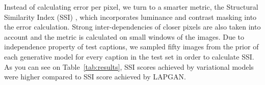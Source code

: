 \documentclass{article} %
\begin{document}
Instead of calculating error per pixel, we turn to a smarter metric, the Structural Similarity Index (SSI) \citep{wang_ssi}, which incorporates luminance and contrast masking into the error calculation. Strong inter-dependencies of closer pixels are also taken into account and the metric is calculated on small windows of the images. Due to independence property of test captions, we sampled fifty images from the prior of each generative model for every caption in the test set in order to calculate SSI. As you can see on Table~\ref{tab:results}, SSI scores achieved by variational models were higher compared to SSI score achieved by LAPGAN.
\end{document}
